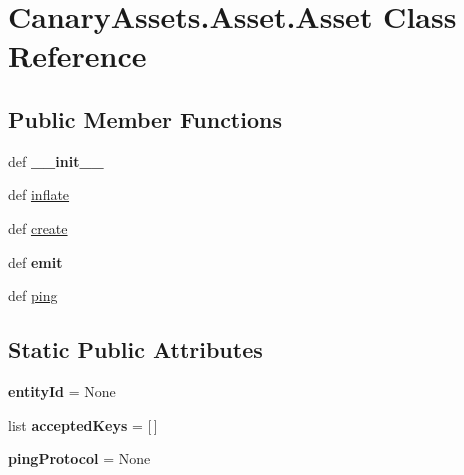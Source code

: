 \hypertarget{class_canary_assets_1_1_asset_1_1_asset}{\section{Canary\-Assets.\-Asset.\-Asset Class Reference}
\label{class_canary_assets_1_1_asset_1_1_asset}
}
\subsection*{Public Member Functions}
\begin{DoxyCompactItemize}
\item 
\hypertarget{class_canary_assets_1_1_asset_1_1_asset_a86ac77042148b8490907c19e59585002}{def {\bfseries \-\_\-\-\_\-init\-\_\-\-\_\-}}\label{class_canary_assets_1_1_asset_1_1_asset_a86ac77042148b8490907c19e59585002}

\item 
def \hyperlink{class_canary_assets_1_1_asset_1_1_asset_a9b0b6f19f09d50dea75071e5c5af494b}{inflate}
\item 
def \hyperlink{class_canary_assets_1_1_asset_1_1_asset_ab568c50f237defe61b7d0d058a547cc6}{create}
\item 
\hypertarget{class_canary_assets_1_1_asset_1_1_asset_acf5d55e86c096f3319b4265d93e0f1c8}{def {\bfseries emit}}\label{class_canary_assets_1_1_asset_1_1_asset_acf5d55e86c096f3319b4265d93e0f1c8}

\item 
def \hyperlink{class_canary_assets_1_1_asset_1_1_asset_ab5655ab09219eb41b0f4b757f3cc339a}{ping}
\end{DoxyCompactItemize}
\subsection*{Static Public Attributes}
\begin{DoxyCompactItemize}
\item 
\hypertarget{class_canary_assets_1_1_asset_1_1_asset_afb1b09475cec8a2a41237a0678d5ec38}{{\bfseries entity\-Id} = None}\label{class_canary_assets_1_1_asset_1_1_asset_afb1b09475cec8a2a41237a0678d5ec38}

\item 
\hypertarget{class_canary_assets_1_1_asset_1_1_asset_ad262abea1621878cbd0b397f0d54356b}{list {\bfseries accepted\-Keys} = \mbox{[}$\,$\mbox{]}}\label{class_canary_assets_1_1_asset_1_1_asset_ad262abea1621878cbd0b397f0d54356b}

\item 
\hypertarget{class_canary_assets_1_1_asset_1_1_asset_ab425107a364d89337e3545ab54a6fc62}{{\bfseries ping\-Protocol} = None}\label{class_canary_assets_1_1_asset_1_1_asset_ab425107a364d89337e3545ab54a6fc62}

\end{DoxyCompactItemize}


